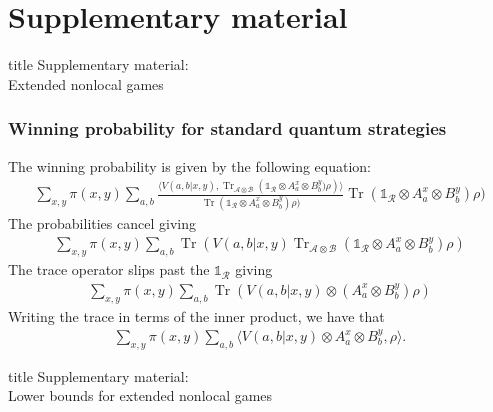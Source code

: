 \documentclass{beamer}
\def\I{\mathds{1}}
\newcommand{\ip}[2]{\langle #1 , #2\rangle}
\newcommand{\biggip}[2]{\biggl\langle #1, #2 \biggr\rangle}
\newcommand{\tr}{\operatorname{Tr}}
\def\A{\mathcal{A}}
\def\B{\mathcal{B}}
\def\R{\mathcal{R}}
\begin{document}
  \section*{Supplementary material}

  \begin{frame}[noframenumbering]
  \vfill
  \centering
  \begin{beamercolorbox}[sep=8pt,center,shadow=true,rounded=true]{title}
    Supplementary material: \\ Extended nonlocal games
  \end{beamercolorbox}
  \vfill
  \end{frame}

\begin{frame}[noframenumbering]
	\frametitle{Winning probability for standard quantum strategies}
	The winning probability is given by the following equation:
	\small{
	\begin{align*}
		\sum_{x,y} \pi(x,y) \sum_{a,b} \frac{ \ip{V(a,b|x,y)}{\tr_{\A\otimes\B}\left(\I_{\R} \otimes A_a^x \otimes B_b^y)\rho\right)} }{\tr(\I_{\R} \otimes A_a^x \otimes B_b^y) \rho)} \tr(\I_{\R} \otimes A_a^x \otimes B_b^y) \rho)
	\end{align*}
The probabilities cancel giving 
\begin{align*}
	\sum_{x,y} \pi(x,y) \sum_{a,b} \tr \left( V(a,b|x,y) \tr_{\A \otimes \B} \left( \I_{\R} \otimes A_a^x \otimes B_b^y \right) \rho \right)
\end{align*}
The trace operator slips past the $\I_{\R}$ giving
\begin{align*}
	\sum_{x,y} \pi(x,y) \sum_{a,b} \tr \left( V(a,b|x,y) \otimes (A_a^x \otimes B_b^y)\rho \right)
\end{align*}
Writing the trace in terms of the inner product, we have that 
\begin{align*}
	\sum_{x,y} \pi(x,y) \sum_{a,b} \biggip{V(a,b|x,y) \otimes A_a^x \otimes B_b^y}{\rho}.
\end{align*}
	}
\end{frame}


  \begin{frame}[noframenumbering]
  \vfill
  \centering
  \begin{beamercolorbox}[sep=8pt,center,shadow=true,rounded=true]{title}
    Supplementary material: \\ Lower bounds for extended nonlocal games
  \end{beamercolorbox}
  \vfill
  \end{frame}
  
\end{document}
